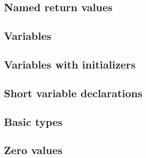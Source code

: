 



\subsection{Named return values}




\subsection{Variables}




\subsection{Variables with initializers}




\subsection{Short variable declarations}




\subsection{Basic types}




\subsection{Zero values}




